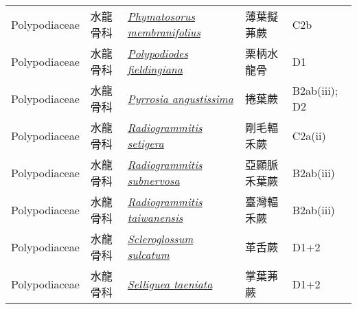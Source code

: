 {\begin{longtable}{L{2.5cm}L{2cm}L{5cm}L{2.5cm}L{3cm}}
    Polypodiaceae & 水龍骨科 & \href{http://www.theplantlist.org/tpl1.1/search?q=Phymatosorus+membranifolius}{\textit{Phymatosorus membranifolius} } & 薄葉擬茀蕨 & C2b    \\
    Polypodiaceae & 水龍骨科 & \href{http://www.theplantlist.org/tpl1.1/search?q=Polypodiodes+fieldingiana}{\textit{Polypodiodes fieldingiana} } & 栗柄水龍骨 & D1    \\
    Polypodiaceae & 水龍骨科 & \href{http://www.theplantlist.org/tpl1.1/search?q=Pyrrosia+angustissima}{\textit{Pyrrosia angustissima} } & 捲葉蕨 & B2ab(iii); D2    \\
    Polypodiaceae & 水龍骨科 & \href{http://www.theplantlist.org/tpl1.1/search?q=Radiogrammitis+setigera}{\textit{Radiogrammitis setigera} } & 剛毛輻禾蕨 & C2a(ii)    \\
    Polypodiaceae & 水龍骨科 & \href{http://www.theplantlist.org/tpl1.1/search?q=Radiogrammitis+subnervosa}{\textit{Radiogrammitis subnervosa} } & 亞顯脈禾葉蕨 & B2ab(iii)    \\
    Polypodiaceae & 水龍骨科 & \href{http://www.theplantlist.org/tpl1.1/search?q=Radiogrammitis+taiwanensis}{\textit{Radiogrammitis taiwanensis} } & 臺灣輻禾蕨 & B2ab(iii)    \\
    Polypodiaceae & 水龍骨科 & \href{http://www.theplantlist.org/tpl1.1/search?q=Scleroglossum+sulcatum}{\textit{Scleroglossum sulcatum} } & 革舌蕨 & D1+2    \\
    Polypodiaceae & 水龍骨科 & \href{http://www.theplantlist.org/tpl1.1/search?q=Selliguea+taeniata}{\textit{Selliguea taeniata} } & 掌葉茀蕨 & D1+2    \\

\end{longtable}}
